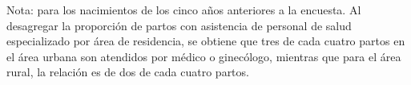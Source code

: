 Nota: para los nacimientos de los cinco años anteriores a la encuesta. Al desagregar la proporción de partos con asistencia de personal de salud especializado por área de residencia, se obtiene que tres de cada cuatro partos en el área urbana son atendidos por médico o ginecólogo, mientras que para el área rural, la relación es de  dos de cada cuatro partos.